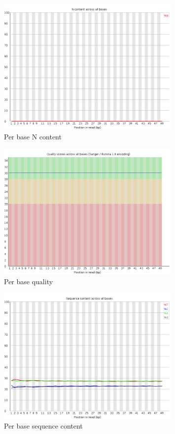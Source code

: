 \documentclass[UTF8]{ctexart}
\begin{document}
\begin{figure}[!htb]
	\centering
	\includegraphics[width=0.8\textwidth]{img/SRR14325859_FastQC_Origin_img/per_base_n_content.png}	
	\caption{Per base N content\protect}    
\end{figure}

\begin{figure}[!htb]
	\centering
	\includegraphics[width=0.8\textwidth]{img/SRR14325859_FastQC_Origin_img/per_base_quality.png}	
	\caption{Per base quality\protect}    
\end{figure}

\begin{figure}[!htb]
	\centering
	\includegraphics[width=0.8\textwidth]{img/SRR14325859_FastQC_Origin_img/per_base_sequence_content.png}	
	\caption{Per base sequence content\protect}    
\end{figure}
\end{document}
